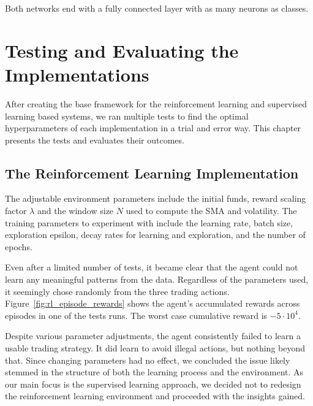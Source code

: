 \documentclass[a4paper,oneside,onecolumn,12pt]{book}
\begin{document}
	Both networks end with a fully connected layer with as many neurons as classes.

\section{Testing and Evaluating the Implementations}
After creating the base framework for the reinforcement learning and supervised learning based systems, we ran multiple tests to find the optimal hyperparameters of each implementation in a trial and error way. This chapter presents the tests and evaluates their outcomes.
	\subsection{The Reinforcement Learning Implementation}
	The adjustable environment parameters include the initial funds, reward scaling factor $\lambda$ and the window size $N$ used to compute the SMA and volatility. The training parameters to experiment with include the learning rate, batch size, exploration epsilon, decay rates for learning and exploration, and the number of epochs.

	Even after a limited number of tests, it became clear that the agent could not learn any meaningful patterns from the data. Regardless of the parameters used, it seemingly chose randomly from the three trading actions. Figure~\ref{fig:rl_episode_rewards} shows the agent's accumulated rewards across episodes in one of the tests runs. The worst case cumulative reward is $-5 \cdot 10^4$.

	Despite various parameter adjustments, the agent consistently failed to learn a usable trading strategy. It did learn to avoid illegal actions, but nothing beyond that. Since changing parameters had no effect, we concluded the issue likely stemmed in the structure of both the learning process and the environment. As our main focus is the supervised learning approach, we decided not to redesign the reinforcement learning environment and proceeded with the insights gained.
\end{document}
